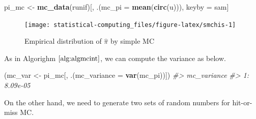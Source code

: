 \documentclass[]{book}
\newenvironment{Shaded}{\begin{snugshade}}{\end{snugshade}}
\newcommand{\CommentTok}[1]{\textcolor[rgb]{0.56,0.35,0.01}{\textit{#1}}}
\newcommand{\DataTypeTok}[1]{\textcolor[rgb]{0.13,0.29,0.53}{#1}}
\newcommand{\DecValTok}[1]{\textcolor[rgb]{0.00,0.00,0.81}{#1}}
\newcommand{\FloatTok}[1]{\textcolor[rgb]{0.00,0.00,0.81}{#1}}
\newcommand{\KeywordTok}[1]{\textcolor[rgb]{0.13,0.29,0.53}{\textbf{#1}}}
\newcommand{\NormalTok}[1]{#1}
\newcommand{\OperatorTok}[1]{\textcolor[rgb]{0.81,0.36,0.00}{\textbf{#1}}}
\newcommand{\StringTok}[1]{\textcolor[rgb]{0.31,0.60,0.02}{#1}}
\theoremstyle{definition}
\theoremstyle{definition}
\theoremstyle{definition}
\theoremstyle{remark}
\begin{document}
\begin{Shaded}
\begin{Highlighting}[]
\NormalTok{pi_mc <-}
\StringTok{  }\KeywordTok{mc_data}\NormalTok{(runif)[,}
\NormalTok{                 .(}\DataTypeTok{mc_pi =} \KeywordTok{mean}\NormalTok{(}\KeywordTok{circ}\NormalTok{(u))),}
\NormalTok{                 keyby =}\StringTok{ }\NormalTok{sam]}
\end{Highlighting}
\end{Shaded}

\begin{Shaded}
\end{Shaded}

\begin{figure}[H]

{\centering \texttt{[image: statistical-computing\_files/figure-latex/smchis-1]} 

}

\caption{Empirical distribution of $\hat\pi$ by simple MC}\label{fig:smchis}
\end{figure}

As in Algorighm \(\ref{alg:algmcint}\), we can compute the variance as below.

\begin{Shaded}
\begin{Highlighting}[]
\NormalTok{(mc_var <-}
\StringTok{  }\NormalTok{pi_mc[,}
\NormalTok{        .(}\DataTypeTok{mc_variance =} \KeywordTok{var}\NormalTok{(mc_pi))])}
\CommentTok{#>    mc_variance}
\CommentTok{#> 1:    8.09e-05}
\end{Highlighting}
\end{Shaded}

On the other hand, we need to generate two sets of random numbers for hit-or-miss MC.
\end{document}
